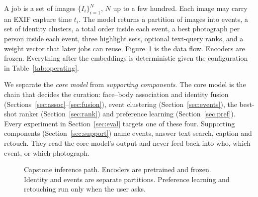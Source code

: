 \documentclass[conference]{IEEEtran}
\begin{document}
A job is a set of images $\{I_i\}_{i=1}^{N}$, $N$ up to a few hundred. Each
image may carry an EXIF capture time $t_i$. The model returns a partition of
images into events, a set of identity clusters, a total order inside each
event, a best photograph per person inside each event, three highlight sets,
optional text-query ranks, and a weight vector that later jobs can reuse.
Figure~\ref{fig:pipeline} is the data flow. Encoders are frozen. Everything
after the embeddings is deterministic given the configuration in
Table~\ref{tab:operating}.

We separate the \emph{core model} from \emph{supporting components}. The core
model is the chain that decides the curation: face--body association and
identity fusion (Sections~\ref{sec:assoc}--\ref{sec:fusion}), event clustering
(Section~\ref{sec:events}), the best-shot ranker (Section~\ref{sec:rank}) and
preference learning (Section~\ref{sec:pref}). Every experiment in
Section~\ref{sec:eval} targets one of these four. Supporting components
(Section~\ref{sec:support}) name events, answer text search, caption and
retouch. They read the core model's output and never feed back into who, which
event, or which photograph.

\begin{figure}[t]
\centering
{}
\caption{Capstone inference path. Encoders are pretrained and frozen. Identity
and events are separate partitions. Preference learning and retouching run
only when the user asks.}
\label{fig:pipeline}
\end{figure}
\end{document}
